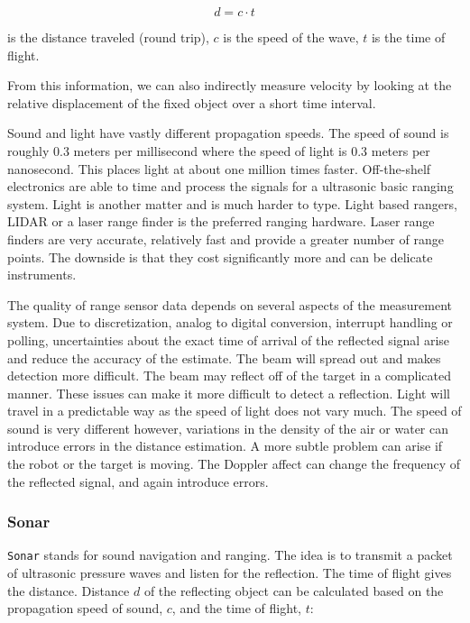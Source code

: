 \[d = c\cdot t\]

is the distance traveled (round trip), \(c\) is the speed of the wave,
\(t\) is the time of flight.

From this information, we can also indirectly measure velocity by
looking at the relative displacement of the fixed object over a short
time interval.

Sound and light have vastly different propagation speeds. The speed of
sound is roughly 0.3 meters per millisecond where the speed of light is
0.3 meters per nanosecond. This places light at about one million times
faster. Off-the-shelf electronics are able to time and process the
signals for a ultrasonic basic ranging system. Light is another matter
and is much harder to type. Light based rangers, LIDAR or a laser range
finder is the preferred ranging hardware. Laser range finders are very
accurate, relatively fast and provide a greater number of range points.
The downside is that they cost significantly more and can be delicate
instruments.

The quality of range sensor data depends on several aspects of the
measurement system. Due to discretization, analog to digital conversion,
interrupt handling or polling, uncertainties about the exact time of
arrival of the reflected signal arise and reduce the accuracy of the
estimate. The beam will spread out and makes detection more difficult.
The beam may reflect off of the target in a complicated manner. These
issues can make it more difficult to detect a reflection. Light will
travel in a predictable way as the speed of light does not vary much.
The speed of sound is very different however, variations in the density
of the air or water can introduce errors in the distance estimation. A
more subtle problem can arise if the robot or the target is moving. The
Doppler affect can change the frequency of the reflected signal, and
again introduce errors.

\hypertarget{sonar}{%
\subsubsection{Sonar}\label{sonar}}

\texttt{Sonar} stands for sound navigation and ranging. The idea is to
transmit a packet of ultrasonic pressure waves and listen for the
reflection. The time of flight gives the distance. Distance \(d\) of the
reflecting object can be calculated based on the propagation speed of
sound, \(c\), and the time of flight, \(t\):

